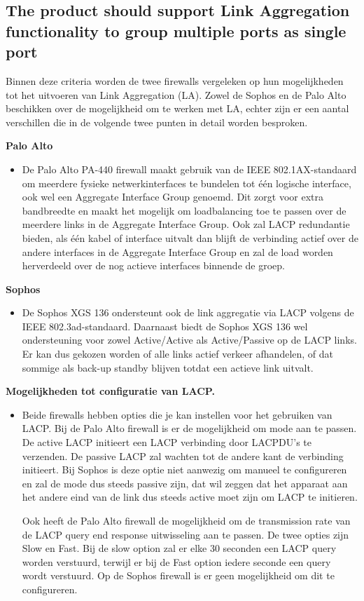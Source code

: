 \subsection{The product should support Link Aggregation functionality to group multiple ports as single port}

Binnen deze criteria worden de twee firewalls vergeleken op hun mogelijkheden tot het uitvoeren van Link Aggregation (LA). Zowel de Sophos en de Palo Alto beschikken over de mogelijkheid om te werken met LA, echter zijn er een aantal verschillen die in de volgende twee punten in detail worden besproken.

\textbf{Palo Alto}
\begin{itemize}[label=\textbullet]
    \item De Palo Alto PA-440 firewall maakt gebruik van de IEEE 802.1AX-standaard om meerdere fysieke netwerkinterfaces te bundelen tot één logische interface, ook wel een Aggregate Interface Group genoemd. Dit zorgt voor extra bandbreedte en maakt het mogelijk om loadbalancing toe te passen over de meerdere links in de Aggregate Interface Group. Ook zal LACP redundantie bieden, als één kabel of interface uitvalt dan blijft de verbinding actief over de andere interfaces in de Aggregate Interface Group en zal de load worden herverdeeld over de nog actieve interfaces binnende de groep.
\end{itemize}

\textbf{Sophos}
\begin{itemize}[label=\textbullet]
    \item De Sophos XGS 136 ondersteunt ook de link aggregatie via LACP volgens de IEEE 802.3ad-standaard. Daarnaast biedt de Sophos XGS 136 wel ondersteuning voor zowel Active/Active als Active/Passive op de LACP links. Er kan dus gekozen worden of alle links actief verkeer afhandelen, of dat sommige als back-up standby blijven totdat een actieve link uitvalt.
\end{itemize}

\textbf{Mogelijkheden tot configuratie van LACP.}
\begin{itemize}[label=\textbullet]
    \item Beide firewalls hebben opties die je kan instellen voor het gebruiken van LACP. Bij de Palo Alto firewall is er de mogelijkheid om mode aan te passen. De active LACP initieert een LACP verbinding door LACPDU's te verzenden. De passive LACP zal wachten tot de andere kant de verbinding initieert. Bij Sophos is deze optie niet aanwezig om manueel te configureren en zal de mode dus steeds passive zijn, dat wil zeggen dat het apparaat aan het andere eind van de link dus steeds active moet zijn om LACP te initieren.
    
    Ook heeft de Palo Alto firewall de mogelijkheid om de transmission rate van de LACP query end response uitwisseling aan te passen. De twee opties zijn Slow en Fast. Bij de slow option zal er elke 30 seconden een LACP query worden verstuurd, terwijl er bij de Fast option iedere seconde een query wordt verstuurd. Op de Sophos firewall is er geen mogelijkheid om dit te configureren.
\end{itemize}


